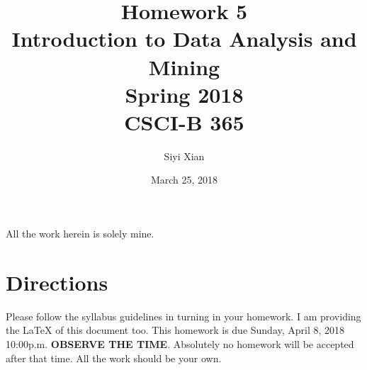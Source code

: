 \documentclass{article}
\begin{document}
\title{Homework 5\\ Introduction to Data Analysis and Mining \\ Spring 2018\\ CSCI-B 365}         %
\author{Siyi Xian}        %
\date{March 25, 2018}          %
\maketitle
\makeatother     %
\pagestyle{plain}
All the work herein is solely mine.
\section*{Directions}
Please follow the syllabus guidelines in turning in your homework.  I am providing the \LaTeX{} of this document too. This homework is due Sunday, April 8, 2018 10:00p.m. \textbf{OBSERVE THE  TIME}. Absolutely no homework will be accepted after that time. All the work should be your own.  



 
 
 
\end{document}
